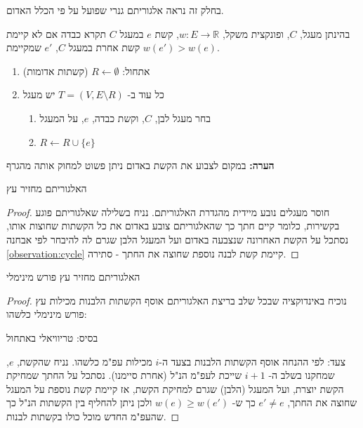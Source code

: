 בחלק זה נראה אלגוריתם גנרי שפועל על פי הכלל האדום.

\begin{definition}
בהינתן מעגל, $C$, ופונקצית משקל, 
$w: E \to \mathbb{R}$,
קשת $e$ במעגל $C$ תקרא כבדה אם לא קיימת קשת אחרת במעגל $C$, 
$e'$
שמקיימת 
$w(e') > w(e)$.
\end{definition}
\begin{enumerate}
\item
אתחול:
$R \leftarrow \emptyset$ 
(קשתות אדומות)
\item
כל עוד ב-%
$T = (V, E \setminus R)$
יש מעגל
\begin{enumerate}
\item
בחר מעגל לבן, $C$, וקשת כבדה, $e$, על המעגל
\item
$R \leftarrow R \cup \{e\}$
\end{enumerate}
\end{enumerate}

\textbf{הערה:}
במקום לצבוע את הקשת באדום ניתן פשוט למחוק אותה מהגרף
\begin{claim}
האלגוריתם מחזיר עץ
\end{claim}
\begin{proof}
חוסר מעגלים נובע מיידית מהגדרת האלגוריתם.
נניח בשלילה שאלגוריתם פוגע בקשירות, כלומר קיים חתך כך שהאלגוריתם צובע באדום את כל הקשתות 
שחוצות אותו, נסתכל על הקשת האחרונה שנצבעה באדום ועל המעגל הלבן שגרם לה להיבחר לפי אבחנה 
\ref{observation:cycle}
קיימת קשת לבנה נוספת שחוצה את החתך - סתירה.
\end{proof}

\begin{claim}
האלגוריתם מחזיר עץ פורש מינימלי
\end{claim}

\begin{proof}
נוכיח באינדוקציה שבכל שלב בריצת האלגוריתם אוסף הקשתות הלבנות מכילות עץ פורש מינימלי כלשהו:

בסיס: טריוויאלי באתחול

צעד: לפי ההנחה אוסף הקשתות הלבנות בצעד ה-$i$ מכילות עפ"מ כלשהו.
נניח שהקשת, $e$, שמחקנו בשלב ה-%
$i+1$
שייכת לעפ"מ הנ"ל (אחרת סיימנו).
נסתכל על החתך שמחיקת הקשת יוצרת, ועל המעגל (הלבן) שגרם למחיקת הקשת,
אז קיימת קשת נוספת על המעגל שחוצה את החתך, 
$e' \neq e$
כך ש-%
$w(e) \geq w(e')$
ולכן ניתן להחליף בין הקשתות הנ"ל כך שהעפ"מ החדש מוכל כולו בקשתות לבנות.
\end{proof}


